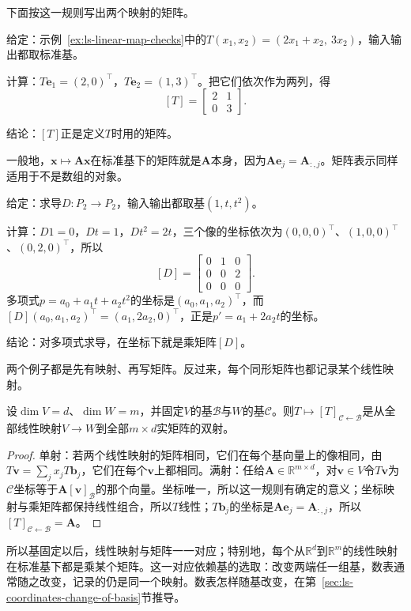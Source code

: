 下面按这一规则写出两个映射的矩阵。
\begin{example}[由基向量的像写出矩阵]
\label{ex:ls-plane-operator-matrix}
给定：示例~\ref{ex:ls-linear-map-checks}中的$T(x_1,x_2)=(2x_1+x_2,\ 3x_2)$，输入输出都取标准基。

计算：$T\bm e_1=(2,0)^{\top}$，$T\bm e_2=(1,3)^{\top}$。把它们依次作为两列，得
\[
 [T]=\begin{bmatrix}2&1\\0&3\end{bmatrix}.
\]

结论：$[T]$正是定义$T$时用的矩阵。
\end{example}
一般地，$\bm x\mapsto\bm A\bm x$在标准基下的矩阵就是$\bm A$本身，因为$\bm A\bm e_j=\bm A_{:,j}$。矩阵表示同样适用于不是数组的对象。
\begin{example}[求导的矩阵表示]
\label{ex:ls-derivative-matrix}
给定：求导$D:P_2\to P_2$，输入输出都取基$(1,t,t^2)$。

计算：$D1=0$，$Dt=1$，$Dt^2=2t$，三个像的坐标依次为$(0,0,0)^\top$、$(1,0,0)^\top$、$(0,2,0)^\top$，所以
\[
 [D]=\begin{bmatrix}0&1&0\\0&0&2\\0&0&0\end{bmatrix}.
\]
多项式$p=a_0+a_1t+a_2t^2$的坐标是$(a_0,a_1,a_2)^\top$，而$[D](a_0,a_1,a_2)^\top=(a_1,2a_2,0)^\top$，正是$p'=a_1+2a_2t$的坐标。

结论：对多项式求导，在坐标下就是乘矩阵$[D]$。
\end{example}

两个例子都是先有映射、再写矩阵。反过来，每个同形矩阵也都记录某个线性映射。
\begin{theorem}[线性映射与矩阵的对应]
\label{thm:ls-map-matrix-correspondence}
设$\dim V=d$、$\dim W=m$，并固定$V$的基$\mathcal B$与$W$的基$\mathcal C$。则$T\mapsto[T]_{\mathcal C\leftarrow\mathcal B}$是从全部线性映射$V\to W$到全部$m\times d$实矩阵的双射。
\end{theorem}
\begin{proof}
单射：若两个线性映射的矩阵相同，它们在每个基向量上的像相同，由$T\bm v=\sum_jx_jT\bm b_j$，它们在每个$\bm v$上都相同。满射：任给$\bm A\in\mathbb R^{m\times d}$，对$\bm v\in V$令$T\bm v$为$\mathcal C$坐标等于$\bm A[\bm v]_{\mathcal B}$的那个向量。坐标唯一，所以这一规则有确定的意义；坐标映射与乘矩阵都保持线性组合，所以$T$线性；$T\bm b_j$的坐标是$\bm A\bm e_j=\bm A_{:,j}$，所以$[T]_{\mathcal C\leftarrow\mathcal B}=\bm A$。
\end{proof}
所以基固定以后，线性映射与矩阵一一对应；特别地，每个从$\mathbb R^d$到$\mathbb R^m$的线性映射在标准基下都是乘某个矩阵。这一对应依赖基的选取：改变两端任一组基，数表通常随之改变，记录的仍是同一个映射。数表怎样随基改变，在第~\ref{sec:ls-coordinates-change-of-basis}节推导。

